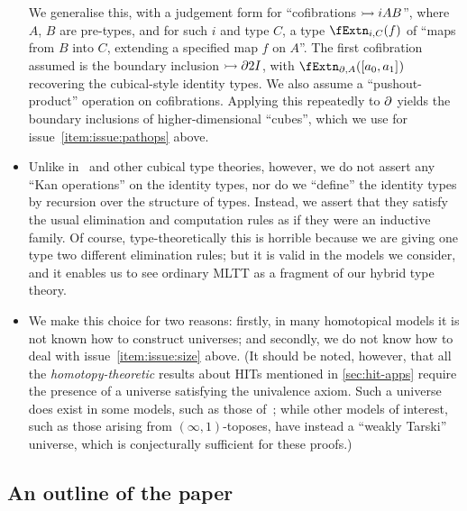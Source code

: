 \documentclass{amsart}
\begin{document}
\begin{itemize}
  We generalise this, with a judgement form for ``cofibrations $\rightarrowtail{i}{A}{B}$'', where $A$, $B$ are pre-types, and for such $i$ and type $C$, a type $\extn{i}{C}{f}$ of ``maps from $B$ into $C$, extending a specified map $f$ on $A$''.
  The first cofibration assumed is the boundary inclusion $\rightarrowtail{\partial}{2}{I}$, with $\extn{\del}{A}{\copair{a_0}{a_1}}$ recovering the cubical-style identity types.
  We also assume a ``pushout-product'' operation on cofibrations.
  Applying this repeatedly to $\partial$ yields the boundary inclusions of higher-dimensional ``cubes'', which we use for issue~\ref{item:issue:pathops} above. 
\item Unlike in~\cite{lb:cubical-tt} and other cubical type theories, however, we do not assert any ``Kan operations'' on the identity types, nor do we ``define'' the identity types by recursion over the structure of types.
  Instead, we assert that they satisfy the usual elimination and computation rules as if they were an inductive family.
  Of course, type-theoretically this is horrible because we are giving one type two different elimination rules; but it is valid in the models we consider, and it enables us to see ordinary MLTT as a fragment of our hybrid type theory.
\item {}  
  We make this choice for two reasons: firstly, in many homotopical models it is not known how to construct universes; and secondly, we do not know how to deal with issue~\ref{item:issue:size} above.
  (It should be noted, however, that all the \emph{homotopy-theoretic} results about HITs mentioned in \cref{sec:hit-apps} require the presence of a universe satisfying the univalence axiom.
  Such a universe does exist in some models, such as those of~\cite{klv:ssetmodel,shulman:invdia,shulman:elreedy}; while other models of interest, such as those arising from $(\infty,1)$-toposes, have instead a ``weakly Tarski'' universe, which is conjecturally sufficient for these proofs.)

\end{itemize}

\subsection{An outline of the paper}
\label{sec:outline}
\end{document}

